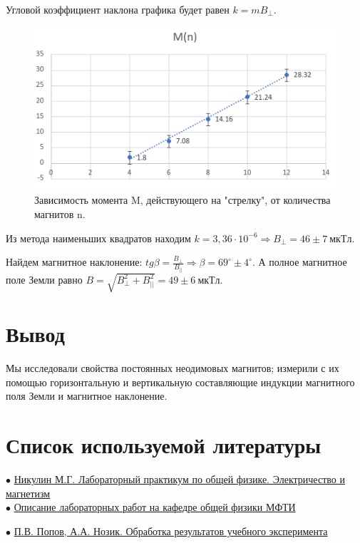 \begin{enumerate}
Угловой коэффициент наклона графика будет равен $k=mB_{\bot}$.
\begin{figure}[H]
    \centering
    \includegraphics{M(n).png}
    \caption{Зависимость момента M, действующего на "стрелку", от количества магнитов n.}
\end{figure}

Из метода наименьших квадратов находим $k=3,36\cdot 10^{-6}\Rightarrow B_\bot=46\pm7\ мкТл$.

Найдем магнитное наклонение: $tg\beta=\frac{B_\bot}{B_{||}}\Rightarrow \beta=69^{\circ}\pm4^{\circ}$. А полное магнитное поле Земли равно $B=\sqrt{B_\bot^2+B_{||}^2}=49\pm6\ мкТл$.

\section{{Вывод}}


Мы исследовали свойства постоянных неодимовых магнитов;
измерили с их помощью горизонтальную и вертикальную составляющие
индукции магнитного поля Земли и магнитное наклонение.


\section{{Список используемой литературы}}

$\bullet$ \href{https://vk.com/doc-139677307_612194888}{Никулин М.Г. Лабораторный практикум по общей физике. Электричество и магнетизм}\\

$\bullet$ \href{https://mipt.ru/education/chair/physics/S_III/lab_el.php}{Описание лабораторных работ на кафедре общей физики МФТИ}

$\bullet$ \href{https://vk.com/doc-139677307_612194961}{П.В. Попов, А.А. Нозик. Обработка результатов учебного эксперимента}


\end{enumerate}

